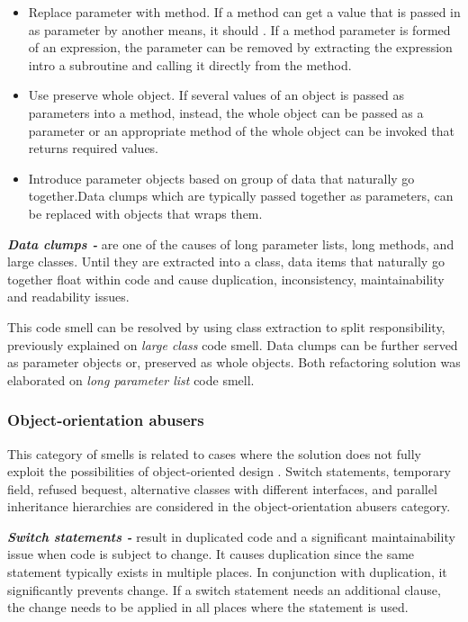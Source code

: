 \begin{itemize}
\item Replace parameter with method. If a method can get a value that is passed in as parameter by another means, it should \cite{fowlerRefactor}. If a method parameter is formed of an expression, the parameter can be removed by extracting the expression intro a subroutine and calling it directly from the method. 
\item Use preserve whole object. If several values of an object is passed as parameters into a method, instead, the whole object can be passed as a parameter or an appropriate method of the whole object can be invoked that returns required values.
\item Introduce parameter objects based on group of data that naturally go together.Data clumps which are typically passed together as parameters, can be replaced with objects that wraps them. 
\end{itemize}

\textit{\textbf{Data clumps -}} are one of the causes of long parameter lists, long methods, and large classes. Until they are extracted into a class, data items that naturally go together float within code and cause duplication, inconsistency, maintainability and readability issues.

This code smell can be resolved by using class extraction to split responsibility, previously explained on \textit{large class} code smell. Data clumps can be further served as parameter objects or, preserved as whole objects. Both refactoring solution was elaborated on \textit{long parameter list} code smell.

\subsubsection*{Object-orientation abusers}
This category of smells is related to cases where the solution does not fully exploit the possibilities of object-oriented design \cite{mantylaTaxonomy}. Switch statements, temporary field, refused bequest, alternative classes with different interfaces, and parallel inheritance hierarchies are considered in the object-orientation abusers category. 

\textit{\textbf{Switch statements -}} result in duplicated code and a significant maintainability issue when code is subject to change. It causes duplication since the same statement typically exists in multiple places. In conjunction with duplication, it significantly prevents change. If a switch statement needs an additional clause, the change needs to be applied in all places where the statement is used.

